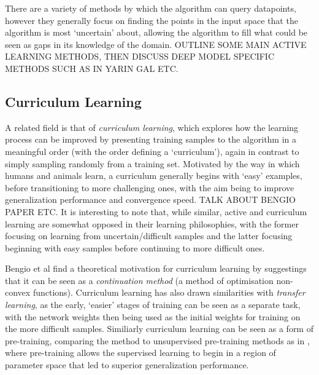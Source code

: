 \documentclass[a4paper,11pt]{article}
\begin{document}
There are a variety of methods by which the algorithm can query datapoints, however they generally focus on finding the points in the input space that the algorithm is most `uncertain' about, allowing the algorithm to fill what could be seen as gaps in its knowledge of the domain. OUTLINE SOME MAIN ACTIVE LEARNING METHODS, THEN DISCUSS DEEP MODEL SPECIFIC METHODS SUCH AS IN YARIN GAL ETC.

\subsection{Curriculum Learning}
A related field is that of \textit{curriculum learning}, which explores how the learning process can be improved by presenting training samples to the algorithm in a meaningful order (with the order defining a `curriculum'), again in contrast to simply sampling randomly from a training set. Motivated by the way in which humans and animals learn, a curriculum generally begins with `easy' examples, before transitioning to more challenging ones, with the aim being to improve generalization performance and convergence speed. TALK ABOUT BENGIO PAPER ETC. It is interesting to note that, while similar, active and curriculum learning are somewhat opposed in their learning philosophies, with the former focusing on learning from uncertain/difficult samples and the latter focusing beginning with easy samples before continuing to more difficult ones.

Bengio et al \cite{Bengio 09} find a theoretical motivation for curriculum learning by suggestings that it can be seen as a \textit{continuation method} (a method of optimisation non-convex functions). Curriculum learning has also drawn similarities with \textit{transfer learning}, as the early, `easier' stages of training can be seen as a separate task, with the network weights then being used as the initial weights for training on the more difficult samples. Similiarly curriculum learning can be seen as a form of pre-training, comparing the method to unsupervised pre-training methods as in \cite{Erhan 09}, where pre-training allows the supervised learning to begin in a region of parameter space that led to superior generalization performance. 

\end{document}
